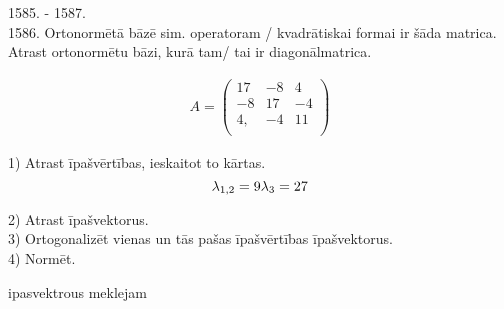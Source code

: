\documentclass[12pt]{article}
\begin{document}
\pagebreak

1585. - 1587. \\
1586. Ortonormētā bāzē sim. operatoram / kvadrātiskai formai ir šāda matrica. Atrast ortonormētu bāzi, kurā tam/ tai ir diagonālmatrica.

\begin{gather*}
	A = 
	\begin{pmatrix}
   		17 & -8 & 4 \\
   		-8 & 17 & -4 \\
   		4, & -4 & 11 \\
	\end{pmatrix}
\end {gather*}


1) Atrast īpašvērtības, ieskaitot to kārtas.
$$
\lambda_{1,2} = 9 \\
\lambda_{3} = 27
$$

2) Atrast īpašvektorus. \\
3) Ortogonalizēt vienas un tās pašas īpašvērtības īpašvektorus. \\
4) Normēt.

ipasvektrous meklejam 
\end{document}
